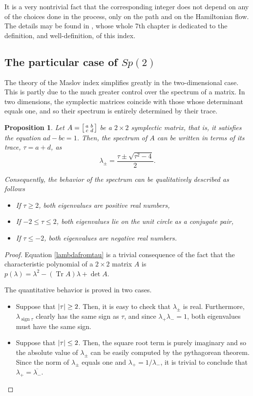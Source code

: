 \documentclass{article}
\newtheorem{prop}{Proposition}
\theoremstyle{nonumberplain}
\newtheorem{proof}{Proof}
\DeclareMathOperator{\sign}{sign}
\DeclarePairedDelimiter{\abs}{\lvert}{\rvert}
\newcommand{\conj}[1]{\overline{#1}}
\DeclareMathOperator{\trace}{Tr}
\begin{document}
It is a very nontrivial fact that the corresponding integer does not depend on any of the choices done in the process, only on the path and on the Hamiltonian flow. The details may be found in \cite{audin}, whose whole 7th chapter is dedicated to the definition, and well-definition, of this index.

\subsection{The particular case of $Sp(2)$}

The theory of the Maslov index simplifies greatly in the two-dimensional case. This is partly due to the much greater control over the spectrum of a matrix. In two dimensions, the symplectic matrices coincide with those whose determinant equals one, and so their spectrum is entirely determined by their trace.

\begin{prop}
Let $A = \mleft[\begin{smallmatrix} a & b \\ c & d \end{smallmatrix}\mright]$ be a $2 \times 2$ symplectic matrix, that is, it satisfies the equation $ad - bc = 1$. Then, the spectrum of $A$ can be written in terms of its trace, $\tau = a+d$, as
\begin{equation}\label{lambdafromtau}
\lambda_\pm = \frac{\tau \pm \sqrt{\tau^2 - 4}}2.
\end{equation}

Consequently, the behavior of the spectrum can be qualitatively described as follows
\begin{itemize}
\item If $\tau \geq 2$, both eigenvalues are positive real numbers,
\item If $-2 \leq \tau \leq 2$, both eigenvalues lie on the unit circle as a conjugate pair,
\item If $\tau \leq -2$, both eigenvalues are negative real numbers.
\end{itemize}
\end{prop}

\begin{proof}
Equation \eqref{lambdafromtau} is a trivial consequence of the fact that the characteristic polynomial of a $2 \times 2$ matrix $A$ is $p(\lambda) = \lambda^2 - (\trace A) \lambda + \det A$.

The quantitative behavior is proved in two cases.
\begin{itemize}
\item Suppose that $\abs \tau \geq 2$. Then, it is easy to check that $\lambda_\pm$ is real. Furthermore, $\lambda_{\sign \tau}$ clearly has the same sign as $\tau$, and since $\lambda_+ \lambda_- = 1$, both eigenvalues must have the same sign.
\item Suppose that $\abs \tau \leq 2$. Then, the square root term is purely imaginary and so the absolute value of $\lambda_\pm$ can be easily computed by the pythagorean theorem. Since the norm of $\lambda_\pm$ equals one and $\lambda_+ = 1/\lambda_-$, it is trivial to conclude that $\lambda_+ = \conj{\lambda_-}$.
\end{itemize}
\end{proof}
\end{document}
